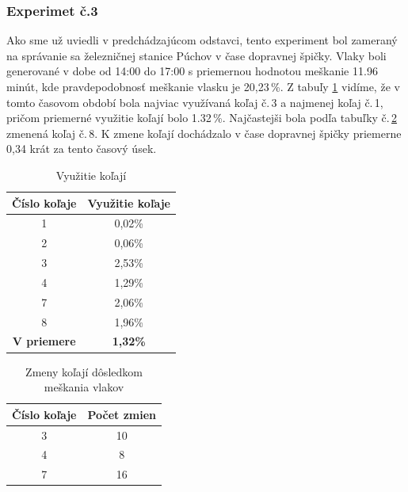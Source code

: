 \documentclass[12pt,a4paper,titlepage,final]{article}
\begin{document}
\subsubsection{Experimet č.3}

Ako sme už uviedli v predchádzajúcom odstavci, tento experiment bol zameraný na správanie sa železničnej stanice Púchov v čase dopravnej špičky. Vlaky boli generované v dobe od 14:00 do 17:00 s priemernou hodnotou meškanie 11.96 minút, kde pravdepodobnosť meškanie vlasku je 20,23\,\%. Z tabuľy \ref{tab4} vidíme, že v tomto časovom období bola najviac využívaná koľaj č.\,3 a najmenej koľaj č.\,1, pričom priemerné využitie koľají bolo 1.32\,\%. Najčastejši bola podľa tabuľky č.\,\ref{tab5} zmenená koľaj č.\,8. K zmene koľají dochádzalo v čase dopravnej špičky priemerne 0,34 krát za tento časový úsek.

\begin{table}[h]
\centering
\begin{center}
\begin{tabular}{| c | c |}
\hline
{\textbf{Číslo koľaje}} & {\textbf{Využitie koľaje}} \\
\hline
1 & 0,02\% \\
2 & 0,06\% \\
3 & 2,53\% \\
4 & 1,29\% \\
7 & 2,06\% \\
8 & 1,96\% \\
\hline
{\textbf{V priemere}} & {\textbf{1,32\%}} \\
\hline
\end{tabular}
\caption{Využitie koľají}
\label{tab4}
\end{center}
\end{table}

\begin{table}[h]
\centering
\begin{center}
\begin{tabular}{| c | c |}
\hline
{\textbf{Číslo koľaje}} & {\textbf{Počet zmien}} \\
\hline
3 & 10 \\
4 & 8 \\
7 & 16 \\
\hline
\end{tabular}
\caption{Zmeny koľají dôsledkom meškania vlakov}
\label{tab5}
\end{center}
\end{table}
\end{document}
